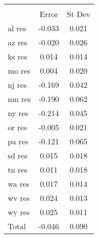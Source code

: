 {
\def\sym#1{\ifmmode^{#1}\else\(^{#1}\)\fi}
\begin{tabular}{l*{1}{cc}}
\hline\hline
                    &\multicolumn{2}{c}{}     \\
                    &       Error&      St Dev\\
\hline
al res              &      -0.033&       0.021\\
az res              &      -0.020&       0.026\\
ks res              &       0.014&       0.014\\
mo res              &       0.004&       0.020\\
nj res              &      -0.169&       0.042\\
nm res              &      -0.190&       0.062\\
ny res              &      -0.214&       0.045\\
or res              &      -0.005&       0.021\\
pa res              &      -0.121&       0.065\\
sd res              &       0.015&       0.018\\
tn res              &       0.011&       0.018\\
wa res              &       0.017&       0.014\\
wv res              &       0.024&       0.013\\
wy res              &       0.025&       0.011\\
Total               &      -0.046&       0.090\\
\hline\hline
\end{tabular}
}
